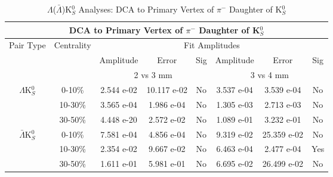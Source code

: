 \documentclass[../AnalysisNoteJBuxton.tex]{subfiles}
\begin{document}
\begin{table}
 \centering
 \begin{tabular}{|c|c|c|c|c||c|c|c|}
  \multicolumn{8}{c}{DCA to Primary Vertex of $\pi^{-}$ Daughter of K$^{0}_{S}$} \\
  \hline
  \multirow{3}{*}{Pair Type} & \multirow{3}{*}{Centrality} & \multicolumn{6}{c|}{Fit Amplitudes} \\
  \cline{3-8}
   & & Amplitude & Error & Sig & Amplitude & Error & Sig \\  
  \cline{3-8}
   & & \multicolumn{3}{c||}{2 vs 3 mm} & \multicolumn{3}{c|}{3 vs 4 mm} \\  
  \hline  
  \multirow{3}{*}{$\Lambda$K$^{0}_{S}$}  
   &  0-10\% & 2.544 e-02 & 10.117 e-02 & No & 3.537 e-04 & 3.539 e-04 & No \\
   & 10-30\% & 3.565 e-04 & 1.986 e-04 & No & 1.305 e-03 & 2.713 e-03 & No \\
   & 30-50\% & 4.448 e-20 & 2.572 e-02 & No & 1.089 e-01 & 3.232 e-01 & No \\
  \hline  
  \multirow{3}{*}{$\bar{\Lambda}$K$^{0}_{S}$}  
   &  0-10\% & 7.581 e-04 & 4.856 e-04 & No & 9.319 e-02 & 25.359 e-02 & No \\
   & 10-30\% & 2.354 e-02 & 9.667 e-02 & No & 6.463 e-04 & 2.477 e-04 & Yes \\
   & 30-50\% & 1.611 e-01 & 5.981 e-01 & No & 6.695 e-02 & 26.499 e-02 & No \\
  \hline
 \end{tabular}
 \caption{$\Lambda$($\bar{\Lambda}$)K$^{0}_{S}$ Analyses: DCA to Primary Vertex of $\pi^{-}$ Daughter of K$^{0}_{S}$}
 \label{tab:DcaToPrimVertexNegPionDaughtOfK0LamK0}
\end{table}
\end{document}
